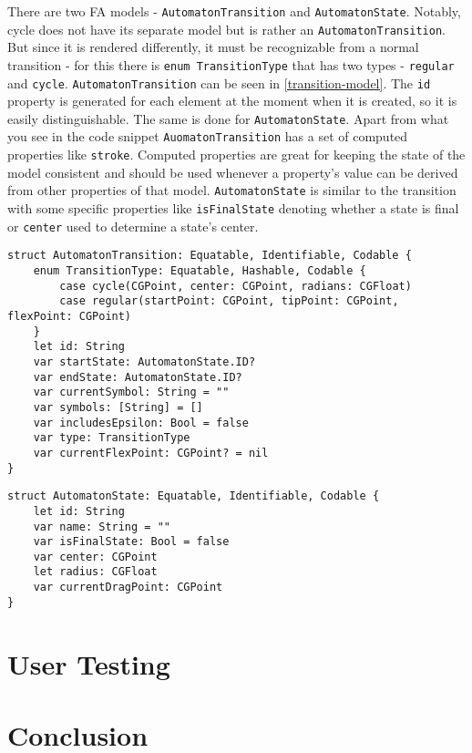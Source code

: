 There are two FA models - \lstinline{AutomatonTransition} and \lstinline{AutomatonState}. Notably, cycle does not have its separate model but is rather an \lstinline{AutomatonTransition}. But since it is rendered differently, it must be recognizable from a normal transition - for this there is \lstinline{enum TransitionType} that has two types - \lstinline{regular} and \lstinline{cycle}. \lstinline{AutomatonTransition} can be seen in \ref{transition-model}. The \lstinline{id} property is generated for each element at the moment when it is created, so it is easily distinguishable. The same is done for \lstinline{AutomatonState}.  Apart from what you see in the code snippet \lstinline{AuomatonTransition} has a set of computed properties like \lstinline{stroke}. Computed properties are great for keeping the state of the model consistent and should be used whenever a property's value can be derived from other properties of that model. \lstinline{AutomatonState} is similar to the transition with some specific properties like \lstinline{isFinalState} denoting whether a state is final or \lstinline{center} used to determine a state's center.

\begin{lstlisting}[caption={Transition model}, label=transition-model]
struct AutomatonTransition: Equatable, Identifiable, Codable {
    enum TransitionType: Equatable, Hashable, Codable {
        case cycle(CGPoint, center: CGPoint, radians: CGFloat)
        case regular(startPoint: CGPoint, tipPoint: CGPoint, flexPoint: CGPoint)
    }
    let id: String
    var startState: AutomatonState.ID?
    var endState: AutomatonState.ID?
    var currentSymbol: String = ""
    var symbols: [String] = []
    var includesEpsilon: Bool = false
    var type: TransitionType
    var currentFlexPoint: CGPoint? = nil
}
\end{lstlisting}

\begin{lstlisting}[caption={State model}, label=state-model]
struct AutomatonState: Equatable, Identifiable, Codable {
    let id: String
    var name: String = ""
    var isFinalState: Bool = false
    var center: CGPoint
    let radius: CGFloat
    var currentDragPoint: CGPoint
}
\end{lstlisting}

\chapter{User Testing}

\chapter{Conclusion}

